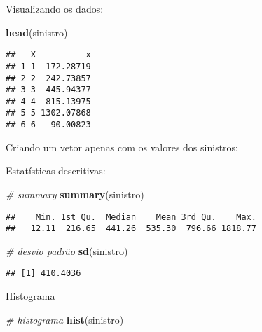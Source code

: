 \documentclass[]{article}
\newenvironment{Shaded}{\begin{snugshade}}{\end{snugshade}}
\newcommand{\CommentTok}[1]{\textcolor[rgb]{0.56,0.35,0.01}{\textit{#1}}}
\newcommand{\KeywordTok}[1]{\textcolor[rgb]{0.13,0.29,0.53}{\textbf{#1}}}
\newcommand{\NormalTok}[1]{#1}
\newcommand{\OperatorTok}[1]{\textcolor[rgb]{0.81,0.36,0.00}{\textbf{#1}}}
\newcommand{\StringTok}[1]{\textcolor[rgb]{0.31,0.60,0.02}{#1}}
\begin{document}
Visualizando os dados:

\begin{Shaded}
\begin{Highlighting}[]
\KeywordTok{head}\NormalTok{(sinistro)}
\end{Highlighting}
\end{Shaded}

\begin{verbatim}
##   X          x
## 1 1  172.28719
## 2 2  242.73857
## 3 3  445.94377
## 4 4  815.13975
## 5 5 1302.07868
## 6 6   90.00823
\end{verbatim}

Criando um vetor apenas com os valores dos sinistros:

\begin{Shaded}
\end{Shaded}

Estatísticas descritivas:

\begin{Shaded}
\begin{Highlighting}[]
\CommentTok{# summary}
\KeywordTok{summary}\NormalTok{(sinistro)}
\end{Highlighting}
\end{Shaded}

\begin{verbatim}
##    Min. 1st Qu.  Median    Mean 3rd Qu.    Max. 
##   12.11  216.65  441.26  535.30  796.66 1818.77
\end{verbatim}

\begin{Shaded}
\begin{Highlighting}[]
\CommentTok{# desvio padrão}
\KeywordTok{sd}\NormalTok{(sinistro)}
\end{Highlighting}
\end{Shaded}

\begin{verbatim}
## [1] 410.4036
\end{verbatim}

Histograma

\begin{Shaded}
\begin{Highlighting}[]
\CommentTok{# histograma}
\KeywordTok{hist}\NormalTok{(sinistro)}
\end{Highlighting}
\end{Shaded}
\end{document}
